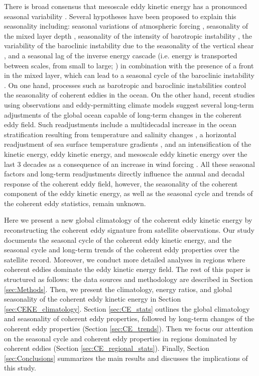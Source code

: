 \documentclass[draft,linenumbers]{agujournal2019}
\begin{document}
There is broad consensus that mesoscale eddy kinetic energy has a pronounced seasonal variability \citep{Qiu_seasonal_1999,Qiu_seasonal_2004,Kang_On_2017,Uchida_Seasonality_2017}. 
Several hypotheses have been proposed to explain this seasonality including: seasonal variations of atmospheric forcing \citep{Sasaki_seasonal_2014}, seasonality of the mixed layer depth \citep{Qiu_seasonal_2014,Callies_season_2015}, seasonality of the intensity of barotropic instability \citep{Qiu_seasonal_2004}, the variability of the baroclinic instability due to the seasonality of the vertical shear \citep{Qiu_seasonal_1999}, and a seasonal lag of the inverse energy cascade (i.e. energy is transported between scales, from small to large; \citealp{Arbic_cascade_2013}) in combination with the presence of a front in the mixed layer, which can lead to a seasonal cycle of the baroclinic instability \citep{Qiu_seasonal_2014}. On one hand, processes such as barotropic and baroclinic instabilities control the seasonality of coherent eddies in the ocean. 
On the other hand, recent studies using observations and eddy-permitting climate models suggest several long-term adjustments of the global ocean capable of long-term changes in the coherent eddy field. 
Such readjustments include a multidecadal increase in the ocean stratification resulting from temperature and salinity changes \citep{Li_stratification_2020}, a horizontal readjustment of sea surface temperature gradients \citep{Cane_sst_trends_1997,Bouali_SST_grad_trends_2017,Ruela_SST_trends_2020}, and an intensification of the kinetic energy, eddy kinetic energy, and mesoscale eddy kinetic energy over the last 3 decades as a consequence of an increase in wind forcing \citep{Hu_acceleration_2020,Wunsch_speeding_2020,Martinez_Kinetic_2021}. 
All these seasonal factors and long-term readjustments directly influence the annual and decadal response of the coherent eddy field, however, the seasonality of the coherent component of the eddy kinetic energy, as well as the seasonal cycle and trends of the coherent eddy statistics, remain unknown.

Here we present a new global climatology of the coherent eddy kinetic energy by reconstructing the coherent eddy signature from satellite observations. Our study documents the seasonal cycle of the coherent eddy kinetic energy, and the seasonal cycle and long-term trends of the coherent eddy properties over the satellite record. 
Moreover, we conduct more detailed analyses in regions where coherent eddies dominate the eddy kinetic energy field. 
The rest of this paper is structured as follows:  the data sources and methodology are described in Section \ref{sec:Methods}.
Then, we present the climatology, energy ratios, and global seasonality of the coherent eddy kinetic energy in Section \ref{sec:CEKE_climatology}. 
Section \ref{sec:CE_stats} outlines the global climatology and seasonality of coherent eddy properties, followed by long-term changes of the coherent eddy properties (Section \ref{sec:CE_trends}). Then we focus our attention on the seasonal cycle and coherent eddy properties in regions dominated by coherent eddies (Section \ref{sec:CE_regional_stats}). 
Finally, Section \ref{sec:Conclusions} summarizes the main results and discusses the implications of this study.
\end{document}
